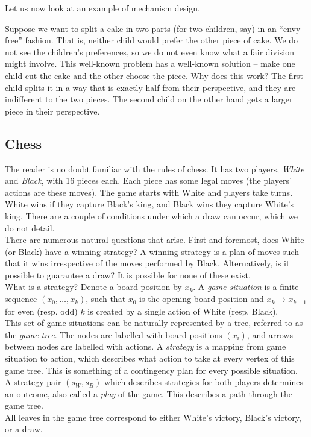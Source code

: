 Let us now look at an example of mechanism design.

\begin{fex}
	Suppose we want to split a cake in two parts (for two children, say) in an ``envy-free'' fashion. That is, neither child would prefer the other piece of cake. We do not see the children's preferences, so we do not even know what a fair division might involve. This well-known problem has a well-known solution -- make one child cut the cake and the other choose the piece. Why does this work? The first child splits it in a way that is exactly half from their perspective, and they are indifferent to the two pieces. The second child on the other hand gets a larger piece in their perspective.
\end{fex}

\subsection{Chess}

	The reader is no doubt familiar with the rules of chess. It has two players, \emph{White} and \emph{Black}, with 16 pieces each. Each piece has some legal moves (the players' actions are these moves). The game starts with White and players take turns. White wins if they capture Black's king, and Black wins they capture White's king. There are a couple of conditions under which a draw can occur, which we do not detail.\\
	There are numerous natural questions that arise.
	First and foremost, does White (or Black) have a winning strategy? A winning strategy is a plan of moves such that it wins irrespective of the moves performed by Black. Alternatively, is it possible to guarantee a draw? It is possible for none of these exist.\\

	What is a strategy? Denote a board position by $x_k$. A \emph{game situation} is a finite sequence $(x_0,\ldots,x_k)$, such that
	$x_0$ is the opening board position and $x_k \to x_{k+1}$ for even (resp. odd) $k$ is created by a single action of White (resp. Black).\\
	This set of game situations can be naturally represented by a tree, referred to as the \emph{game tree}. The nodes are labelled with board positions $(x_i)$, and arrows between nodes are labelled with actions. A \emph{strategy} is a mapping from game situation to action, which describes what action to take at every vertex of this game tree. This is something of a contingency plan for every possible situation.\\
	A strategy pair $(s_W, s_B)$ which describes strategies for both players determines an outcome, also called a \emph{play} of the game. This describes a path through the game tree.\\
	All leaves in the game tree correspond to either White's victory, Black's victory, or a draw.\\

